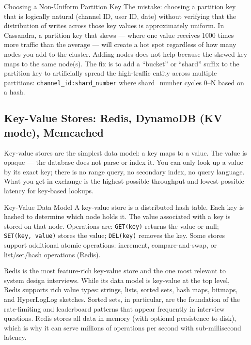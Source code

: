 \documentclass[11pt,a4paper]{article}
\begin{document}
\begin{trapbox}{Choosing a Non-Uniform Partition Key}
The mistake: choosing a partition key that is logically natural (channel ID, user ID, date) without verifying that the distribution of writes across those key values is approximately uniform. In Cassandra, a partition key that skews --- where one value receives 1000 times more traffic than the average --- will create a hot spot regardless of how many nodes you add to the cluster. Adding nodes does not help because the skewed key maps to the same node(s). The fix is to add a ``bucket'' or ``shard'' suffix to the partition key to artificially spread the high-traffic entity across multiple partitions: \texttt{channel\_id:shard\_number} where shard\_number cycles 0--N based on a hash.
\end{trapbox}

\subsection{Key-Value Stores: Redis, DynamoDB (KV mode), Memcached}

Key-value stores are the simplest data model: a key maps to a value. The value is opaque --- the database does not parse or index it. You can only look up a value by its exact key; there is no range query, no secondary index, no query language. What you get in exchange is the highest possible throughput and lowest possible latency for key-based lookups.

\begin{termbox}{Key-Value Data Model}
A key-value store is a distributed hash table. Each key is hashed to determine which node holds it. The value associated with a key is stored on that node. Operations are: \texttt{GET(key)} returns the value or null; \texttt{SET(key, value)} stores the value; \texttt{DEL(key)} removes the key. Some stores support additional atomic operations: increment, compare-and-swap, or list/set/hash operations (Redis).
\end{termbox}

Redis is the most feature-rich key-value store and the one most relevant to system design interviews. While its data model is key-value at the top level, Redis supports rich value types: strings, lists, sorted sets, hash maps, bitmaps, and HyperLogLog sketches. Sorted sets, in particular, are the foundation of the rate-limiting and leaderboard patterns that appear frequently in interview questions. Redis stores all data in memory (with optional persistence to disk), which is why it can serve millions of operations per second with sub-millisecond latency.
\end{document}
